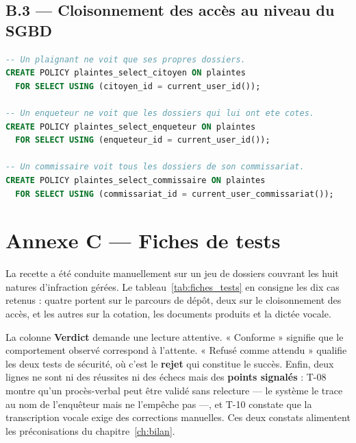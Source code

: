 \subsection*{B.3 — Cloisonnement des accès au niveau du SGBD}

\begin{lstlisting}[language=SQL,caption={Politique d'accès par ligne sur la table des plaintes},label={lst:rls}]
-- Un plaignant ne voit que ses propres dossiers.
CREATE POLICY plaintes_select_citoyen ON plaintes
  FOR SELECT USING (citoyen_id = current_user_id());

-- Un enqueteur ne voit que les dossiers qui lui ont ete cotes.
CREATE POLICY plaintes_select_enqueteur ON plaintes
  FOR SELECT USING (enqueteur_id = current_user_id());

-- Un commissaire voit tous les dossiers de son commissariat.
CREATE POLICY plaintes_select_commissaire ON plaintes
  FOR SELECT USING (commissariat_id = current_user_commissariat());
\end{lstlisting}

\section*{Annexe C — Fiches de tests}

La recette a été conduite manuellement sur un jeu de dossiers couvrant les huit natures d'infraction gérées. Le tableau~\ref{tab:fiches_tests} en consigne les dix cas retenus : quatre portent sur le parcours de dépôt, deux sur le cloisonnement des accès, et les autres sur la cotation, les documents produits et la dictée vocale.

La colonne \textbf{Verdict} demande une lecture attentive. « Conforme » signifie que le comportement observé correspond à l'attente. « Refusé comme attendu » qualifie les deux tests de sécurité, où c'est le \textbf{rejet} qui constitue le succès. Enfin, deux lignes ne sont ni des réussites ni des échecs mais des \textbf{points signalés} : T-08 montre qu'un procès-verbal peut être validé sans relecture — le système le trace au nom de l'enquêteur mais ne l'empêche pas —, et T-10 constate que la transcription vocale exige des corrections manuelles. Ces deux constats alimentent les préconisations du chapitre~\ref{ch:bilan}.

